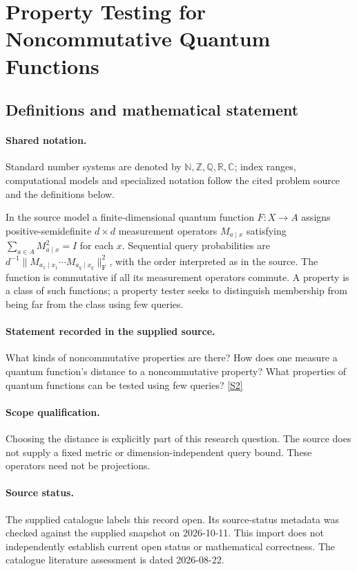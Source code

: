 \documentclass[11pt]{article}
\newcommand{\sref}[2]{\hyperlink{source:#1:#2}{[S#2]}}
\begin{document}
\section{Property Testing for Noncommutative Quantum Functions}\label{statement}

\subsection{Definitions and mathematical statement}

\paragraph{Shared notation.}Standard number systems are denoted by $\mathbb N,\mathbb Z,\mathbb Q,\mathbb R,\mathbb C$; index ranges, computational models and specialized notation follow the cited problem source and the definitions below.


In the source model a finite-dimensional quantum function $F:X\to A$ assigns positive-semidefinite $d\times d$ measurement operators $M_{a\mid x}$ satisfying $\sum_{a\in A}M_{a\mid x}^2=I$ for each $x$. Sequential query probabilities are $d^{-1}\|M_{a_1\mid x_1}\cdots M_{a_q\mid x_q}\|_{\mathrm F}^2$, with the order interpreted as in the source. The function is commutative if all its measurement operators commute. A property is a class of such functions; a property tester seeks to distinguish membership from being far from the class using few queries.
\paragraph{Statement recorded in the supplied source.}
What kinds of noncommutative properties are there? How does one measure a quantum function’s distance to a noncommutative property? What properties of quantum functions can be tested using few queries? \sref{statement}{2}
\paragraph{Scope qualification.}
Choosing the distance is explicitly part of this research question. The source does not supply a fixed metric or dimension-independent query bound. These operators need not be projections.
\paragraph{Source status.}
The supplied catalogue labels this record open. Its source-status metadata was checked against the supplied snapshot on 2026-10-11. This import does not independently establish current open status or mathematical correctness. The catalogue literature assessment is dated 2026-08-22.
\end{document}
